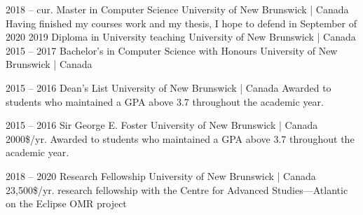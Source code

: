 \documentclass[9.5pt]{developercv} %
\begin{document}
\justifying


\begin{entrylist}
    \entry
        {2018 -- cur.}
        {Master in Computer Science}
        {University of New Brunswick | Canada}
        {Having finished my courses work and my thesis, I hope to defend in September of 2020}
    \entry
        {2019}
        {Diploma in University teaching}
        {University of New Brunswick | Canada}
        {}
    \entry
        {2015 -- 2017}
        {Bachelor's in Computer Science with Honours}
        {University of New Brunswick | Canada}
        {}
\end{entrylist}


\begin{entrylist}
    \entry
        {2015 -- 2016}
        {Dean's List}
        {University of New Brunswick | Canada}
        {Awarded to students who maintained a GPA above 3.7 throughout the academic year.}
\end{entrylist}


\begin{entrylist}
    \entry
        {2015 -- 2016}
        {Sir George E. Foster}
        {University of New Brunswick | Canada}
        {2000\$/yr. Awarded to students who maintained a GPA above 3.7 throughout the academic year.}
        
    \entry
        {2018 -- 2020}
        {Research Fellowship}
        {University of New Brunswick | Canada}
        {23,500\$/yr. research fellowship  with the Centre for Advanced Studies---Atlantic on the Eclipse OMR project}
\end{entrylist}

\end{document}

